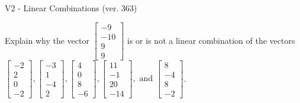 \begin{exercise}
  \begin{exerciseTitle}V2 - Linear Combinations (ver. 363)\end{exerciseTitle}
  \begin{exerciseStatement}
    Explain why the vector \(\left[\begin{array}{c}
-9 \\
-10 \\
9 \\
9
\end{array}\right]\)  is or is not a linear 
	combination of the vectors \(\left[\begin{array}{c}
-2 \\
2 \\
0 \\
-2
\end{array}\right] , \left[\begin{array}{c}
-3 \\
1 \\
-4 \\
2
\end{array}\right] , \left[\begin{array}{c}
4 \\
0 \\
8 \\
-6
\end{array}\right] , \left[\begin{array}{c}
11 \\
-1 \\
20 \\
-14
\end{array}\right] , \text{ and } \left[\begin{array}{c}
8 \\
-4 \\
8 \\
-2
\end{array}\right]\).
	



\end{exerciseStatement}
\end{exercise}
